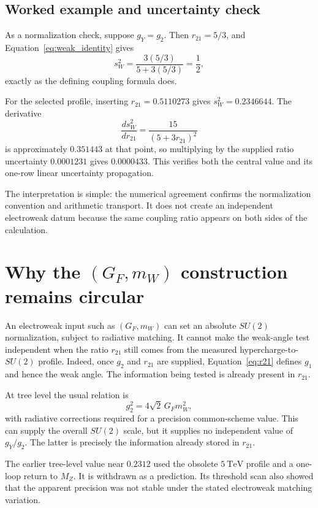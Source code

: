 \documentclass[11pt]{article}
\begin{document}
\subsection{Worked example and uncertainty check}

As a normalization check, suppose $g_Y=g_2$. Then
$r_{21}=5/3$, and Equation~\eqref{eq:weak_identity} gives
\[
s_W^2=\frac{3(5/3)}{5+3(5/3)}=\frac12,
\]
exactly as the defining coupling formula does.

For the selected profile, inserting $r_{21}=0.5110273$ gives
$s_W^2=0.2346644$. The derivative
\[
\frac{d s_W^2}{d r_{21}}
=\frac{15}{(5+3r_{21})^2}
\]
is approximately $0.351443$ at that point, so multiplying by the supplied
ratio uncertainty $0.0001231$ gives $0.0000433$. This verifies both the central
value and its one-row linear uncertainty propagation.

The interpretation is simple: the numerical agreement confirms the
normalization convention and arithmetic transport. It does not create an
independent electroweak datum because the same coupling ratio appears on both
sides of the calculation.

\section{Why the
\texorpdfstring{$(G_F,m_W)$}{(Fermi constant, W mass)}
construction remains circular}

An electroweak input such as $(G_F,m_W)$ can set an absolute $SU(2)$
normalization, subject to radiative matching. It cannot make the weak-angle
test independent when the ratio $r_{21}$ still comes from the measured
hypercharge-to-$SU(2)$ profile. Indeed, once $g_2$ and $r_{21}$ are supplied,
Equation~\eqref{eq:r21} defines $g_1$ and hence the weak angle. The information
being tested is already present in $r_{21}$.

At tree level the usual relation is
\[
g_2^2=4\sqrt{2}\,G_Fm_W^2,
\]
with radiative corrections required for a precision common-scheme value. This
can supply the overall $SU(2)$ scale, but it supplies no independent value of
$g_Y/g_2$. The latter is precisely the information already stored in
$r_{21}$.

The earlier tree-level value near $0.2312$ used the obsolete $5~\mathrm{TeV}$
profile and a one-loop return to $M_Z$. It is withdrawn as a prediction. Its
threshold scan also showed that the apparent precision was not stable under
the stated electroweak matching variation.
\end{document}
